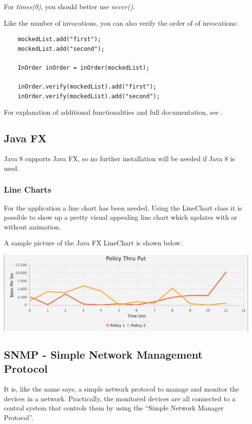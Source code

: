 \documentclass[11pt, a4paper]{article}
\begin{document}
For \textit{times(0)}, you should better use \textit{never()}.
 
Like the number of invocations, you can also verify the order of of invocations:

\begin{lstlisting}
    mockedList.add("first");
    mockedList.add("second");
    
    InOrder inOrder = inOrder(mockedList);
    
    inOrder.verify(mockedList).add("first");
    inOrder.verify(mockedList).add("second");  
\end{lstlisting} 
    
For explanation of additional functionalities and full documentation, see \cite{MockitoDownload}.

\subsection{Java FX}
Java 8 supports Java FX, so no further installation will be needed if Java 8 is used. 

\subsubsection{Line Charts}

For the application a line chart has been needed. Using the LineChart class it is possible to show up a pretty visual appealing line chart which updates with or without animation.

A sample picture of the Java FX LineChart is shown below. 

\includegraphics[width=\textwidth]{images/linechart.png}


\subsection{SNMP - Simple Network Management Protocol}

It is, like the name says, a simple network protocol to manage and monitor the devices in a network. Practically, the monitored devices are all connected to a central system that controls them by using the “Simple Network Manager Protocol”.
\end{document}
